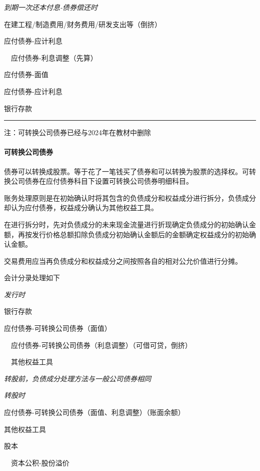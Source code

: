 \documentclass[UTF8,12pt]{ctexart}
\newenvironment{Dr}{%
	\begin{list}{}%
		{
			\setlength{\leftmargin}{2em}
			\setlength{\labelwidth}{2em}
			\setlength{\labelsep}{0pt}
			\setlength{\itemindent}{0pt}
			\setlength{\listparindent}{0pt}
			\setlength{\parsep}{0pt}
			\setlength{\topsep}{0pt}
		}
		\item[\textbf{借：}]
	}{%
	\end{list}
}
\newenvironment{Cr}{%
	\begin{list}{}%
		{
			\setlength{\leftmargin}{2em}
			\setlength{\labelwidth}{2em}
			\setlength{\labelsep}{0pt}
			\setlength{\itemindent}{0pt}
			\setlength{\listparindent}{0pt}
			\setlength{\parsep}{0pt}
			\setlength{\topsep}{0pt}
		}
		\item[\textbf{贷：}]
	}{%
	\end{list}
}
\numberwithin{equation}{section} %
\numberwithin{figure}{section}
\numberwithin{table}{section}
\begin{document}
	\textit{到期一次还本付息-债券偿还时}
	
	\begin{Dr}
		在建工程/制造费用/财务费用/研发支出等（倒挤）
	\end{Dr}
	\begin{Cr}
		应付债券-应计利息
		
		\ \ 应付债券-利息调整（先算）
	\end{Cr}
	
	\begin{Dr}
		应付债券-面值
		
		应付债券-应计利息
	\end{Dr}
	\begin{Cr}
		银行存款
	\end{Cr}

	
	\vspace{5pt}
	\hrule
	\vspace{5pt}
	注：可转换公司债券已经与2024年在教材中删除

	\paragraph{可转换公司债券}
	债券可以转换成股票。等于花了一笔钱买了债券和可以转换为股票的选择权。可转换公司债券在应付债券科目下设置可转换公司债券明细科目。
	
	账务处理原则是在初始确认时将其包含的负债成分和权益成分进行拆分，负债成分却认为应付债券，权益成分确认为其他权益工具。
	
	在进行拆分时，先对负债成分的未来现金流量进行折现确定负债成分的初始确认金额，再按发行价格总额扣除负债成分初始确认金额后的金额确定权益成分的初始确认金额。
	
	交易费用应当再负债成分和权益成分之间按照各自的相对公允价值进行分摊。
	
	会计分录处理如下
	
	\textit{发行时}
	
	\begin{Dr}
		银行存款
	\end{Dr}
	\begin{Cr}
		应付债券-可转换公司债券（面值）
		
		\ \ 应付债券-可转换公司债券（利息调整）（可借可贷，倒挤）
		
		\ \ 其他权益工具
	\end{Cr}

	\textit{转股前，负债成分处理方法与一般公司债券相同}
	
	\textit{转股时}
	
	\begin{Dr}
		应付债券-可转换公司债券（面值、利息调整）（账面余额）
		
		其他权益工具
	\end{Dr}
	\begin{Cr}
		股本
		
		\ \ 资本公积-股份溢价
	\end{Cr}
\end{document}
